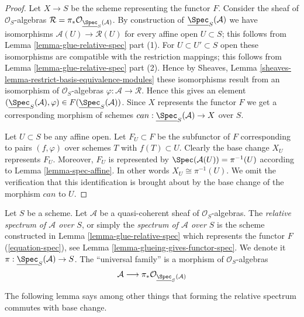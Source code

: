 \begin{proof}
Let $X \to S$ be the scheme representing the functor $F$.
Consider the sheaf of $\mathcal{O}_S$-algebras
$\mathcal{R} = \pi_*\mathcal{O}_{\underline{\Spec}_S(\mathcal{A})}$.
By construction of $\underline{\Spec}_S(\mathcal{A})$
we have isomorphisms $\mathcal{A}(U) \to \mathcal{R}(U)$
for every affine open $U \subset S$; this follows from
Lemma \ref{lemma-glue-relative-spec} part (1).
For $U \subset U' \subset S$ open these isomorphisms are
compatible with the restriction mappings; this follows from
Lemma \ref{lemma-glue-relative-spec} part (2).
Hence by Sheaves, Lemma \ref{sheaves-lemma-restrict-basis-equivalence-modules}
these isomorphisms result from an isomorphism of $\mathcal{O}_S$-algebras
$\varphi : \mathcal{A} \to \mathcal{R}$. Hence this gives an element
$(\underline{\Spec}_S(\mathcal{A}), \varphi)
\in F(\underline{\Spec}_S(\mathcal{A}))$.
Since $X$ represents the functor $F$ we get a corresponding
morphism of schemes $can : \underline{\Spec}_S(\mathcal{A}) \to X$
over $S$.

\medskip\noindent
Let $U \subset S$ be any affine open. Let $F_U \subset F$ be
the subfunctor of $F$ corresponding to pairs $(f, \varphi)$ over
schemes $T$ with $f(T) \subset U$. Clearly the base change
$X_U$ represents $F_U$. Moreover, $F_U$ is represented by
$\Spec(\mathcal{A}(U)) = \pi^{-1}(U)$ according to
Lemma \ref{lemma-spec-affine}. In other words $X_U \cong \pi^{-1}(U)$.
We omit the verification that this identification is brought about
by the base change of the morphism $can$ to $U$.
\end{proof}

\begin{definition}
\label{definition-relative-spec}
Let $S$ be a scheme. Let $\mathcal{A}$ be a quasi-coherent sheaf of
$\mathcal{O}_S$-algebras. The {\it relative spectrum of $\mathcal{A}$ over
$S$}, or simply the {\it spectrum of $\mathcal{A}$ over $S$} is the scheme
constructed in Lemma \ref{lemma-glue-relative-spec} which represents the
functor $F$ (\ref{equation-spec}), see
Lemma \ref{lemma-glueing-gives-functor-spec}.
We denote it $\pi : \underline{\Spec}_S(\mathcal{A}) \to S$.
The ``universal family'' is a morphism of $\mathcal{O}_S$-algebras
$$
\mathcal{A}
\longrightarrow
\pi_*\mathcal{O}_{\underline{\Spec}_S(\mathcal{A})}
$$
\end{definition}

\noindent
The following lemma says among other things that forming the
relative spectrum commutes with base change.

